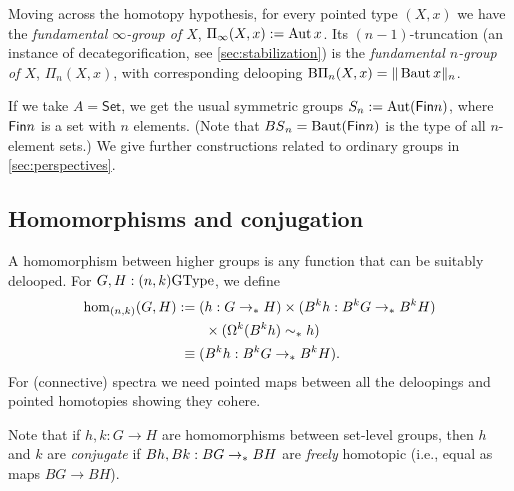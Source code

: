 Moving across the homotopy hypothesis, for every pointed type $(X,x)$
we have the \emph{fundamental $\infty$-group of $X$},
$\Pi_\infty(X,x):=\Aut x$. Its $(n-1)$-truncation (an instance of
decategorification, see \cref{sec:stabilization}) is the
\emph{fundamental $n$-group of $X$}, $\Pi_n(X,x)$,
with corresponding delooping $\mathrm{B}\Pi_n(X,x) = \trunc{n}{\BAut x}$.

If we take $A = \mathsf{Set}$, we get the usual symmetric groups
$\Sym_n := \Aut(\Fin n)$, where $\Fin n$ is a set with $n$
elements. (Note that $\BS_n = \BAut(\Fin n)$ is the type of all
$n$-element sets.)
We give further constructions related to ordinary groups
in \cref{sec:perspectives}.

\subsection{Homomorphisms and conjugation}
\label{sec:homomorphisms}

A homomorphism between higher groups is any
function that can be suitably delooped.
For $G,H : (n,k)\GType$, we define
\begin{align*}
\hom_{(n,k)}(G,H) & := 
(h: G \to_\pt H)\times (B^k h: B^kG \to_\pt B^kH) \\
& \qquad \times (\Omega^k(B^k h) \sim_\pt h) \\
&\phantom{:}\equiv (B^k h: B^kG \to_\pt B^kH).
\end{align*}
For (connective) spectra we need
pointed maps between all the deloopings and pointed homotopies showing
they cohere.

Note that if $h,k : G \to H$ are homomorphisms between set-level
groups, then $h$ and $k$ are \emph{conjugate} if $Bh, Bk : BG \to_\pt BH$ are
\emph{freely} homotopic (i.e., equal as maps $BG \to BH$).

